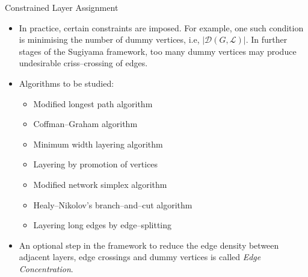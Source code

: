 \documentclass{beamer}
\begin{document}
\begin{frame}{Constrained Layer Assignment}


    \begin{itemize}

        \item In practice, certain constraints are imposed. For example, one such condition is minimising the number of dummy vertices, i.e, $|\mathcal{D}(G, \mathcal{L})|$. In further stages of the Sugiyama framework, too many dummy vertices may produce undesirable criss–crossing of edges.

        \item Algorithms to be studied:

        \begin{itemize}
            
            \item Modified longest path algorithm
            \item Coffman–Graham algorithm
            \item Minimum width layering algorithm
            \item Layering by promotion of vertices
            \item Modified network simplex algorithm
            \item Healy–Nikolov's branch–and–cut algorithm
            \item Layering long edges by edge–splitting

        \end{itemize}

        \item An optional step in the framework to reduce the edge density between adjacent layers, edge crossings and dummy vertices is called \textit{Edge Concentration}.

    \end{itemize}


\end{frame}
\end{document}
